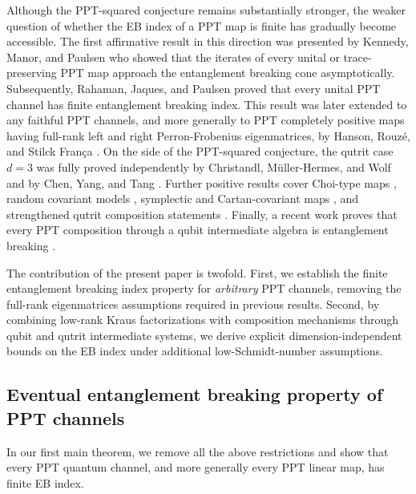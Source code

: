\documentclass[11pt,reqno]{amsart}
\theoremstyle{definition}
\theoremstyle{definition}
\theoremstyle{definition}
\theoremstyle{definition}
\begin{document}
{Although the PPT-squared conjecture remains substantially stronger, the weaker question of whether the EB index of a PPT map is finite has gradually become accessible. The first affirmative result in this direction was presented by Kennedy, Manor, and Paulsen \cite{KMP18} who showed that
the iterates of every unital or trace-preserving PPT map approach the
entanglement breaking cone asymptotically. Subsequently, Rahaman, Jaques, and
Paulsen \cite{RJP18} proved that every unital PPT channel has finite entanglement breaking
index. This result was later extended to any faithful PPT channels, and more generally to PPT
completely positive maps having full-rank left and right Perron-Frobenius
eigenmatrices, by Hanson, Rouz\'{e}, and Stilck Fran\c{c}a \cite{HRSF20}. On the side of the PPT-squared conjecture, the qutrit case $d=3$
was fully proved independently by Christandl, M\"uller-Hermes, and Wolf and by
Chen, Yang, and Tang \cite{CMHW19,CYT19}. Further positive
results cover Choi-type maps \cite{SN22}, random covariant models
\cite{NP26}, symplectic and Cartan-covariant maps \cite{Par26,Pru25}, and strengthened qutrit composition statements
\cite{AL26}. Finally, a recent work proves that every PPT composition through a
qubit intermediate algebra is entanglement breaking \cite{Henry26}.
}

The contribution of the present paper is twofold. First, we establish the finite entanglement breaking index property for \emph{arbitrary} PPT channels, removing the full-rank eigenmatrices assumptions required in previous results. Second, by combining low-rank Kraus factorizations with composition mechanisms through qubit and qutrit intermediate systems, we derive explicit dimension-independent bounds on the EB index under additional low-Schmidt-number assumptions.

\subsection{Eventual entanglement breaking property of PPT channels}

In our first main theorem, we remove all the above restrictions and show that every PPT quantum channel, and more generally every PPT linear map, has finite EB index.
\end{document}
